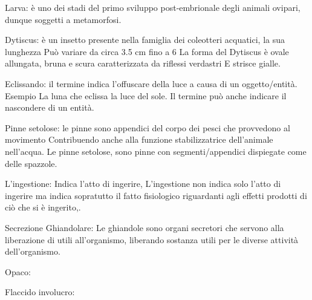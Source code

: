 \documentclass{article}
\begin{document}
Larva: è uno dei stadi del primo sviluppo post-embrionale degli animali ovipari, dunque soggetti a metamorfosi.

Dytiscus: è un insetto presente nella famiglia dei coleotteri acquatici, la sua lunghezza
Può variare da circa 3.5 cm  fino a 6
La forma del Dytiscus è ovale allungata, bruna e scura caratterizzata da riflessi verdastri
E strisce gialle.

Eclissando:  il termine indica l’offuscare della luce a causa di un oggetto/entità. Esempio 
La luna che eclissa la luce del sole.
Il termine può anche indicare il nascondere di un entità.

Pinne setolose: le pinne sono appendici del corpo dei pesci che provvedono al movimento 
Contribuendo anche alla funzione stabilizzatrice dell’animale nell’acqua.
Le pinne setolose, sono pinne con segmenti/appendici dispiegate come delle spazzole.


L’ingestione: Indica l’atto di ingerire, L’ingestione non indica solo l’atto di ingerire ma indica sopratutto il fatto fisiologico riguardanti agli effetti prodotti di ciò che si è ingerito,.


Secrezione Ghiandolare: Le ghiandole sono organi secretori che servono alla liberazione di utili all’organismo, liberando sostanza utili per le diverse attività dell’organismo.

Opaco:


Flaccido involucro:
\end{document}
